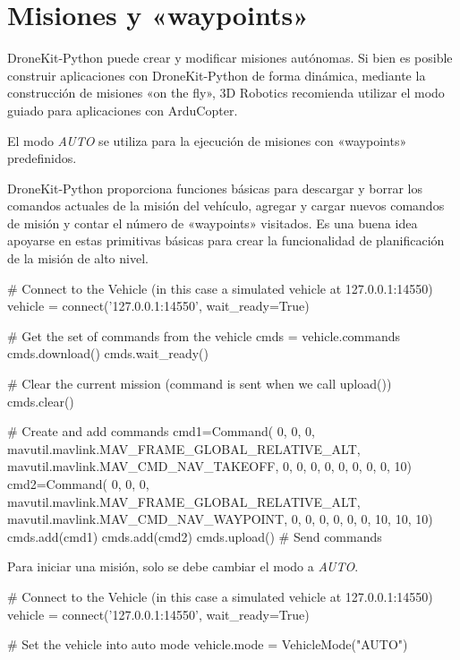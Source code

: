 \section{Misiones y «waypoints»}

DroneKit-Python puede crear y modificar misiones autónomas. Si bien es posible construir aplicaciones con DroneKit-Python de forma dinámica, mediante la construcción de misiones «on the fly», 3D Robotics recomienda utilizar el modo guiado para aplicaciones con ArduCopter.

El modo \textit{AUTO} se utiliza para la ejecución de misiones con «waypoints» predefinidos.

DroneKit-Python proporciona funciones básicas para descargar y borrar los comandos actuales de la misión del vehículo, agregar y cargar nuevos comandos de misión y contar el número de «waypoints» visitados. Es una buena idea apoyarse en estas primitivas básicas para crear la funcionalidad de planificación de la misión de alto nivel.

\begin{listing}[
 float=h!,
 language = Python,
 caption = {Creación de misiones},
 label  = code:misiones]
# Connect to the Vehicle (in this case a simulated vehicle at 127.0.0.1:14550)
vehicle = connect('127.0.0.1:14550', wait_ready=True)

# Get the set of commands from the vehicle
cmds = vehicle.commands
cmds.download()
cmds.wait_ready()

# Clear the current mission (command is sent when we call upload())
cmds.clear()

# Create and add commands
cmd1=Command( 0, 0, 0, mavutil.mavlink.MAV_FRAME_GLOBAL_RELATIVE_ALT, mavutil.mavlink.MAV_CMD_NAV_TAKEOFF, 0, 0, 0, 0, 0, 0, 0, 0, 10)
cmd2=Command( 0, 0, 0, mavutil.mavlink.MAV_FRAME_GLOBAL_RELATIVE_ALT, mavutil.mavlink.MAV_CMD_NAV_WAYPOINT, 0, 0, 0, 0, 0, 0, 10, 10, 10)
cmds.add(cmd1)
cmds.add(cmd2)
cmds.upload() # Send commands
\end{listing}

Para iniciar una misión, solo se debe cambiar el modo a \textit{AUTO}.

\begin{listing}[
 float=h!,
 language = Python,
 caption = {Iniciar misión},
 label  = code:iniciomision]
# Connect to the Vehicle (in this case a simulated vehicle at 127.0.0.1:14550)
vehicle = connect('127.0.0.1:14550', wait_ready=True)

# Set the vehicle into auto mode
vehicle.mode = VehicleMode("AUTO")
\end{listing}

